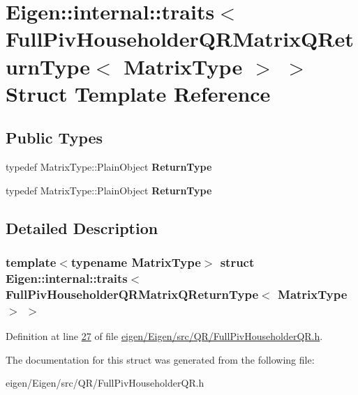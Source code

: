 \hypertarget{struct_eigen_1_1internal_1_1traits_3_01_full_piv_householder_q_r_matrix_q_return_type_3_01_matrix_type_01_4_01_4}{}\section{Eigen\+:\+:internal\+:\+:traits$<$ Full\+Piv\+Householder\+Q\+R\+Matrix\+Q\+Return\+Type$<$ Matrix\+Type $>$ $>$ Struct Template Reference}
\label{struct_eigen_1_1internal_1_1traits_3_01_full_piv_householder_q_r_matrix_q_return_type_3_01_matrix_type_01_4_01_4}
\subsection*{Public Types}
\begin{DoxyCompactItemize}
\item 
\mbox{\label{struct_eigen_1_1internal_1_1traits_3_01_full_piv_householder_q_r_matrix_q_return_type_3_01_matrix_type_01_4_01_4_a1b18d24309d6c761c5b756e76f99f4f9}} 
typedef Matrix\+Type\+::\+Plain\+Object {\bfseries Return\+Type}
\item 
\mbox{\label{struct_eigen_1_1internal_1_1traits_3_01_full_piv_householder_q_r_matrix_q_return_type_3_01_matrix_type_01_4_01_4_a1b18d24309d6c761c5b756e76f99f4f9}} 
typedef Matrix\+Type\+::\+Plain\+Object {\bfseries Return\+Type}
\end{DoxyCompactItemize}


\subsection{Detailed Description}
\subsubsection*{template$<$typename Matrix\+Type$>$\newline
struct Eigen\+::internal\+::traits$<$ Full\+Piv\+Householder\+Q\+R\+Matrix\+Q\+Return\+Type$<$ Matrix\+Type $>$ $>$}



Definition at line \hyperlink{eigen_2_eigen_2src_2_q_r_2_full_piv_householder_q_r_8h_source_l00027}{27} of file \hyperlink{eigen_2_eigen_2src_2_q_r_2_full_piv_householder_q_r_8h_source}{eigen/\+Eigen/src/\+Q\+R/\+Full\+Piv\+Householder\+Q\+R.\+h}.



The documentation for this struct was generated from the following file\+:\begin{DoxyCompactItemize}
\item 
eigen/\+Eigen/src/\+Q\+R/\+Full\+Piv\+Householder\+Q\+R.\+h\end{DoxyCompactItemize}
